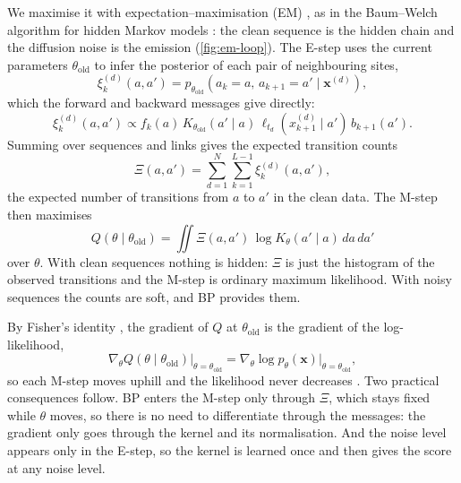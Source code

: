 We maximise it with expectation--maximisation (EM) \cite{dempster1977maximum}, as in the Baum--Welch algorithm for
hidden Markov models \cite{baum1970,rabiner1989tutorial}: the clean sequence is the hidden chain and the diffusion noise
is the emission (\cref{fig:em-loop}). The E-step uses the current parameters $\theta_{\mathrm{old}}$ to infer the
posterior of each pair of neighbouring sites,
\begin{equation}
    \xi_k^{(d)}(a,a')
    =
    p_{\theta_{\mathrm{old}}}
    \left(
        a_k=a,\,
        a_{k+1}=a'
        \mid \mathbf{x}^{(d)}
    \right),
\end{equation}
which the forward and backward messages give directly:
\begin{equation}
    \xi_k^{(d)}(a,a')
    \propto
    f_k(a)\,
    K_{\theta_{\mathrm{old}}}(a'\mid a)\,
    \ell_{t_d}(x_{k+1}^{(d)}\mid a')\,
    b_{k+1}(a').
    \label{eq:pairwise-posterior}
\end{equation}
Summing over sequences and links gives the expected transition counts
\begin{equation}
    \Xi(a,a')
    =
    \sum_{d=1}^{N}
    \sum_{k=1}^{L-1}
    \xi_k^{(d)}(a,a'),
\end{equation}
the expected number of transitions from $a$ to $a'$ in the clean data. The M-step then maximises
\begin{equation}
    Q(\theta\mid\theta_{\mathrm{old}})
    =
    \iint
    \Xi(a,a')\,
    \log K_\theta(a'\mid a)
    \,da\,da'
    \label{eq:em-objective}
\end{equation}
over $\theta$. With clean sequences nothing is hidden: $\Xi$ is just the histogram of the observed transitions and the
M-step is ordinary maximum likelihood. With noisy sequences the counts are soft, and BP provides them.

By Fisher's identity \cite{louis1982,cappe2005}, the gradient of $Q$ at $\theta_{\mathrm{old}}$ is
the gradient of the log-likelihood,
\begin{equation}
    \left.
    \nabla_\theta Q(\theta\mid\theta_{\mathrm{old}})
    \right|_{\theta=\theta_{\mathrm{old}}}
    =
    \nabla_\theta
    \log p_\theta(\mathbf{x})
    \big|_{\theta=\theta_{\mathrm{old}}},
\end{equation}
so each M-step moves uphill and the likelihood never decreases \cite{dempster1977maximum,wu1983}. Two practical
consequences follow. BP enters the M-step only through $\Xi$, which stays fixed while $\theta$ moves, so there is no
need to differentiate through the messages: the gradient only goes through the kernel and its normalisation. And the
noise level appears only in the E-step, so the kernel is learned once and then gives the score at any noise level.

